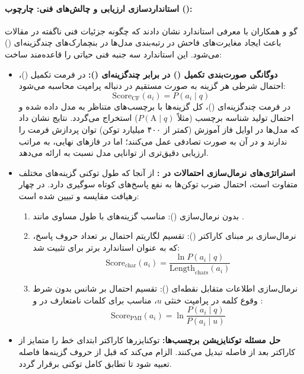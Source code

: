 \paragraph*{استانداردسازی ارزیابی و چالش‌های فنی: چارچوب  ():}
گو و همکاران با معرفی استاندارد  نشان دادند که چگونه جزئیات فنی ناگفته در مقالات باعث ایجاد مغایرت‌های فاحش در رتبه‌بندی مدل‌ها در بنچمارک‌های چندگزینه‌ای () می‌شود. این استاندارد سه جنبه فنی حیاتی را قاعده‌مند ساخت:
\begin{itemize}
    \item \textbf{دوگانگی صورت‌بندی تکمیل () در برابر چندگزینه‌ای ():}
    در فرمت تکمیل ()، احتمال شرطی هر گزینه به صورت مستقیم در دنباله پرامپت محاسبه می‌شود:
    \begin{equation}
        \text{Score}_{\text{CF}}(a_i) = P(a_i \mid q)
    \end{equation}
    در فرمت چندگزینه‌ای ()، کل گزینه‌ها با برچسب‌های متناظر به مدل داده شده و احتمال تولید شناسه برچسب (مثلاً $P(\text{A} \mid q)$) استخراج می‌گردد. نتایج نشان داد که مدل‌ها در اوایل فاز آموزش (کمتر از ۴۰۰ میلیارد توکن) توان پردازش فرمت  را ندارند و در آن به صورت تصادفی عمل می‌کنند؛ اما در فازهای نهایی،  به مراتب ارزیابی دقیق‌تری از توانایی مدل نسبت به  ارائه می‌دهد.
    \item \textbf{استراتژی‌های نرمال‌سازی احتمالات در :}
    از آنجا که طول توکنی گزینه‌های مختلف متفاوت است، احتمال ضرب توکن‌ها به نفع پاسخ‌های کوتاه سوگیری دارد. در  چهار رهیافت مقایسه و تبیین شده است:
    \begin{enumerate}
        \item بدون نرمال‌سازی (): مناسب گزینه‌های با طول مساوی مانند .
        \item نرمال‌سازی بر مبنای کاراکتر (): تقسیم لگاریتم احتمال بر تعداد حروف پاسخ، که به عنوان استاندارد برتر برای  تثبیت شد:
        \begin{equation}
            \text{Score}_{\text{char}}(a_i) = \frac{\ln P(a_i \mid q)}{\text{Length}_{\text{chars}}(a_i)}
        \end{equation}
        \item نرمال‌سازی اطلاعات متقابل نقطه‌ای (): تقسیم احتمال بر شانس بدون شرط وقوع کلمه در پرامپت خنثی $u$، مناسب برای کلمات نامتعارف در  و :
        \begin{equation}
            \text{Score}_{\text{PMI}}(a_i) = \ln \frac{P(a_i \mid q)}{P(a_i \mid u)}
        \end{equation}
    \end{enumerate}
    \item \textbf{حل مسئله توکنایزیشن برچسب‌ها:} توکنایزرها کاراکتر ابتدای خط را متمایز از کاراکتر بعد از فاصله تبدیل می‌کنند.  الزام می‌کند که قبل از حروف گزینه‌ها فاصله تعبیه شود تا تطابق کامل توکنی برقرار گردد.
\end{itemize}

